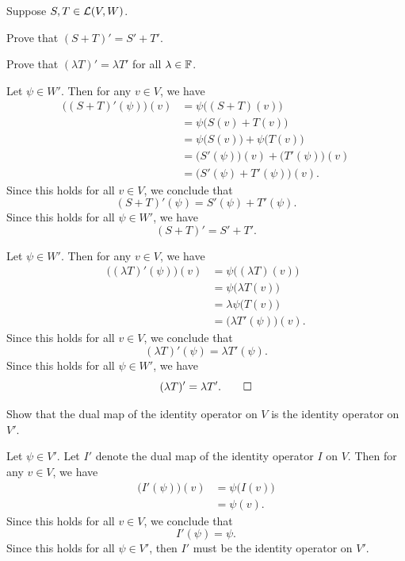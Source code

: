 \begin{exercise}
Suppose $S,T\in\mathcal{L}(V,W)$.
\begin{parts}
\item Prove that $(S+T)'=S'+T'$.
\item Prove that $(\lambda T)'=\lambda T'$ for all $\lambda\in\mathbb{F}$.
\end{parts}
\end{exercise}
\begin{solution}\leavevmode
\begin{parts}
\item Let $\psi\in W'$. Then for any $v\in V$, we have
  \begin{align*}
  \bigl((S+T)'(\psi)\bigr)(v) &= \psi\bigl((S+T)(v)\bigr)\\
   &= \psi\bigl(S(v)+T(v)\bigr)\\
   &= \psi\bigl(S(v)\bigr)+\psi\bigl(T(v)\bigr)\\
   &= \bigl(S'(\psi)\bigr)(v)+\bigl(T'(\psi)\bigr)(v)\\
   &= \bigl(S'(\psi)+T'(\psi)\bigr)(v).
  \end{align*}
  Since this holds for all $v\in V$, we conclude that
  \[ (S+T)'(\psi) = S'(\psi)+T'(\psi). \]
  Since this holds for all $\psi\in W'$, we have
  \[ (S+T)' = S'+T'. \]
\item Let $\psi\in W'$. Then for any $v\in V$, we have
  \begin{align*}
  \bigl((\lambda T)'(\psi)\bigr)(v) &= \psi\bigl((\lambda T)(v)\bigr)\\
   &= \psi\bigl(\lambda T(v)\bigr)\\
   &= \lambda\psi\bigl(T(v)\bigr)\\
   &= \bigl(\lambda T'(\psi)\bigr)(v).
  \end{align*}
  Since this holds for all $v\in V$, we conclude that
  \[ (\lambda T)'(\psi) = \lambda T'(\psi). \]
  Since this holds for all $\psi\in W'$, we have
  \[ (\lambda T)' = \lambda T'. \qedhere \]
\end{parts}
\end{solution}

\begin{exercise}
Show that the dual map of the identity operator on $V$ is the identity operator
on $V'$.
\end{exercise}
\begin{solution}
Let $\psi\in V'$. Let $I'$ denote the dual map of the identity operator $I$ on
$V$. Then for any $v\in V$, we have
\begin{align*}
\bigl(I'(\psi)\bigr)(v) &= \psi\bigl(I(v)\bigr)\\
 &= \psi(v).
\end{align*}
Since this holds for all $v\in V$, we conclude that
\[ I'(\psi) = \psi. \]
Since this holds for all $\psi\in V'$, then $I'$ must be the identity operator
on $V'$.
\end{solution}

